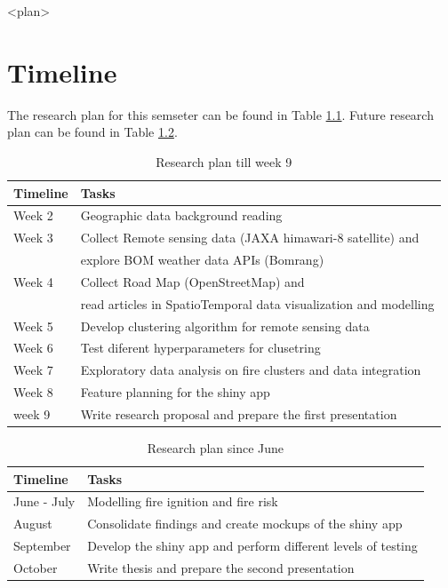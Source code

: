 \documentclass{monashthesis}
\begin{document}
\textless{}plan\textgreater{}

\chapter{Timeline}\label{timeline}

The research plan for this semseter can be found in Table
\ref{tab:timeline1}. Future research plan can be found in Table
\ref{tab:timeline2}.

\begin{table}[!h]

\caption{\label{tab:timeline1}Research plan till week 9}
\centering
\begin{tabular}{ll}
\toprule
Timeline & Tasks\\
\midrule
Week 2 & Geographic data background reading\\
Week 3 & Collect Remote sensing data (JAXA himawari-8 satellite) and\\
 & explore BOM weather data APIs (Bomrang)\\
Week 4 & Collect Road Map (OpenStreetMap) and\\
 & read articles in SpatioTemporal data visualization and modelling\\
\addlinespace
Week 5 & Develop clustering algorithm for remote sensing data\\
Week 6 & Test diferent hyperparameters for clusetring\\
Week 7 & Exploratory data analysis on fire clusters and data integration\\
Week 8 & Feature planning for the shiny app\\
week 9 & Write research proposal and prepare the first presentation\\
\bottomrule
\end{tabular}
\end{table}

\begin{table}[!h]

\caption{\label{tab:timeline2}Research plan since June}
\centering
\begin{tabular}{ll}
\toprule
Timeline & Tasks\\
\midrule
June - July & Modelling fire ignition and fire risk\\
August & Consolidate findings and create mockups of the shiny app\\
September & Develop the shiny app and perform different levels of testing\\
October & Write thesis and prepare the second presentation\\
\bottomrule
\end{tabular}
\end{table}
\end{document}
